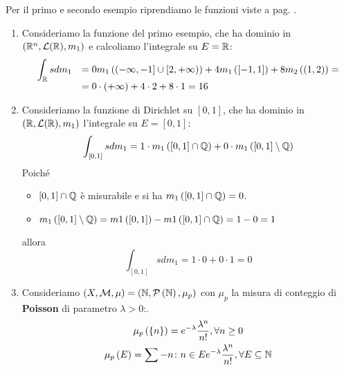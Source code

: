 \begin{examples} Per il primo e secondo esempio riprendiamo le funzioni viste a pag. \pageref{funzionesemplice}.
	\begin{enumerate}
		\item Consideriamo la funzione del primo esempio, che ha dominio in $\left(\mathbb{R}^n,\mathcal{L}(\mathbb{R}),m_1\right)$ e calcoliamo l'integrale su $E=\mathbb{R}$:
		\begin{equation*}
			\begin{array}{ll}
				\displaystyle	\int_{\mathbb{R}}sdm_1&=0m_1\left(\left(-\infty,-1\right]\cup\left[2,+\infty\right)\right)+4m_1\left(\left[-1,1\right]\right)+8m_2\left(\left(1,2\right)\right)=\\
				&=0\cdot\left(+\infty\right)+4\cdot 2+8\cdot 1=16
			\end{array}
		\end{equation*}
		\item \label{funzionedirichletintegrale}Consideriamo la funzione di Dirichlet su $\left[0,1\right]$, che ha dominio in $\left(\mathbb{R},\mathcal{L}(\mathbb{R}),m_1\right)$  l'integrale su $E=\left[0,1\right]$:
		\begin{equation*}
			\int_{\left[0,1\right]}sdm_1=1\cdot m_1\left(\left[0,1\right]\cap\mathbb{Q}\right)+0\cdot m_1\left(\left[0,1\right]\setminus\mathbb{Q}\right)
		\end{equation*}
	Poiché
	\begin{itemize}
		\item $\left[0,1\right]\cap \mathbb{Q}$ è misurabile e si ha $m_1\left(\left[0,1\right]\cap \mathbb{Q}\right)=0$.
		\item $m_1\left(\left[0,1\right]\setminus\mathbb{Q}\right)=m1\left(\left[0,1\right]\right)-m1\left(\left[0,1\right]\cap\mathbb{Q}\right)=1-0=1$
	\end{itemize}
	allora
	\begin{equation*}
		\int_{\left[0,1\right]}sdm_1=1\cdot 0+0\cdot 1=0
	\end{equation*}
\item Consideriamo $\left(X,\mathcal{M},\mu\right)=\left(\mathbb{N},\mathcal{P}\left(\mathbb{N}\right),\mu_p\right)$ con $\mu_p$ la misura di conteggio di \textbf{Poisson} di parametro $\lambda>0$:.
\begin{gather}
	\mu_p\left(\left\{n\right\}\right)=e^{-\lambda}\frac{\lambda^n}{n!}, \forall n\geq 0\\
	\mu_p\left(E\right)=\sum-{n\colon n\in E}e^{-\lambda}\frac{\lambda^n}{n!}, \forall E\subseteq \naturalset

\end{gather}
\end{enumerate}
\end{examples}
